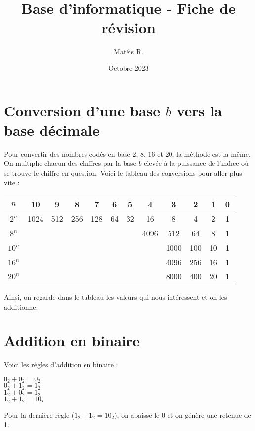 \documentclass{article}
\title{Base d'informatique - Fiche de révision}
\author{Matéis R.}
\date{Octobre 2023}
\begin{document}
	\maketitle

	\section{Conversion d'une base $b$ vers la base décimale}
		Pour convertir des nombres codés en base 2, 8, 16 et 20, la méthode est la même. On multiplie chacun des chiffres par la base $b$ élevée à la puissance de l'indice où se trouve le chiffre en question. Voici le tableau des conversions pour aller plus vite :  
		
		\begin{center}
			\begin{tabular}{ | c | c | c | c | c | c | c | c | c | c | c | c | }
  				\hline
					$n$ & 10 & 9 & 8 & 7 & 6 & 5 & 4 & 3 & 2 & 1 & 0 \\ 
 				\hline
  					 $2^n$ & 1024 & 512 & 256 & 128 & 64 & 32 & 16 & 8 & 4 & 2 & 1 \\ 
	  			\hline
					$8^n$ & & & & & & & 4096 & 512 & 64 & 8 & 1 \\
				\hline
					$10^n$ & & & & & & & & 1000 & 100 & 10 & 1 \\
				\hline
					$16^n$ & & & & & & & & 4096 & 256 & 16 & 1 \\
				\hline
					$20^n$ & & & & & & & & 8000 & 400 & 20 & 1 \\
				\hline
			\end{tabular}
		\end{center}
		
		Ainsi, on regarde dans le tableau les valeurs qui nous intéressent et on les additionne.
	
	\section{Addition en binaire}
		Voici les règles d'addition en binaire :
		
		\begin{center}
			$0_2 + 0_2 = 0_2$ \\
			$0_2 + 1_2 = 1_2$ \\
			$1_2 + 0_2 = 1_2$ \\
			$1_2 + 1_2 = 10_2$ \\
		\end{center}	
		Pour la dernière règle ($1_2 + 1_2 = 10_2$), on abaisse le 0 et on génère une retenue de 1.
\end{document}
